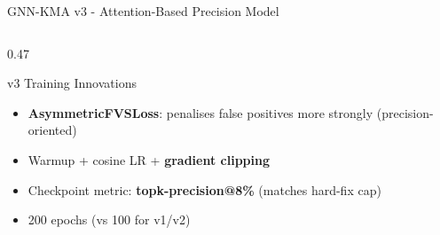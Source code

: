 \documentclass[aspectratio=169]{beamer}
\begin{document}
\begin{frame}{GNN-KMA v3 - Attention-Based Precision Model}
\begin{columns}[T]
\begin{column}{0.47\textwidth}
			\begin{block}{v3 Training Innovations}
				\begin{itemize}
					\item \textbf{AsymmetricFVSLoss}: penalises false positives more
					      strongly (precision-oriented)
					\item Warmup + cosine LR + \textbf{gradient clipping}
					\item Checkpoint metric: \textbf{topk-precision@8\%}
					      (matches hard-fix cap)
					\item 200 epochs (vs 100 for v1/v2)
				\end{itemize}
			\end{block}
		\end{column}
	\end{columns}
\end{frame}
\end{document}
